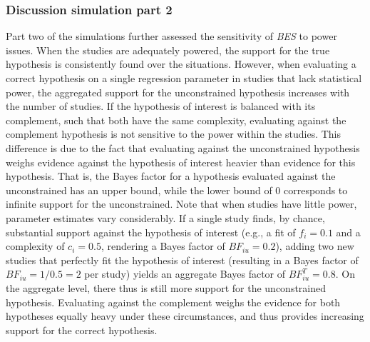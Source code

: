 \documentclass[
  authoryear,
  preprint,
  5p,
  twocolumn]{elsarticle}
\begin{document}
\hypertarget{discussion-simulation-part-2}{%
\subsubsection{Discussion simulation part
2}\label{discussion-simulation-part-2}}

Part two of the simulations further assessed the sensitivity of
\emph{BES} to power issues. When the studies are adequately powered, the
support for the true hypothesis is consistently found over the
situations. However, when evaluating a correct hypothesis on a single
regression parameter in studies that lack statistical power, the
aggregated support for the unconstrained hypothesis increases with the
number of studies. If the hypothesis of interest is balanced with its
complement, such that both have the same complexity, evaluating against
the complement hypothesis is not sensitive to the power within the
studies. This difference is due to the fact that evaluating against the
unconstrained hypothesis weighs evidence against the hypothesis of
interest heavier than evidence for this hypothesis. That is, the Bayes
factor for a hypothesis evaluated against the unconstrained has an upper
bound, while the lower bound of \(0\) corresponds to infinite support
for the unconstrained. Note that when studies have little power,
parameter estimates vary considerably. If a single study finds, by
chance, substantial support against the hypothesis of interest (e.g., a
fit of \(f_i=0.1\) and a complexity of \(c_i=0.5\), rendering a Bayes
factor of \(BF_{iu}=0.2\)), adding two new studies that perfectly fit
the hypothesis of interest (resulting in a Bayes factor of
\(BF_{iu}=1/0.5=2\) per study) yields an aggregate Bayes factor of
\(BF^T_{iu}=0.8\). On the aggregate level, there thus is still more
support for the unconstrained hypothesis. Evaluating against the
complement weighs the evidence for both hypotheses equally heavy under
these circumstances, and thus provides increasing support for the
correct hypothesis.
\end{document}

